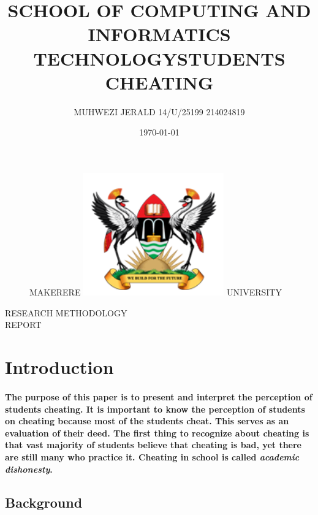 \documentclass[11pt]{article}
\begin{document}
		
\title{SCHOOL OF COMPUTING AND INFORMATICS\\ TECHNOLOGY}
\author{MUHWEZI JERALD 14/U/25199 214024819}
\date{\today{}}
\begin{figure}
	\begin{center}
	\Huge MAKERERE \includegraphics[width=172pt]{muk.png} \Huge UNIVERSITY
	\end{center}
\end{figure}
	\maketitle
	
	\begin{center}
	RESEARCH METHODOLOGY \\REPORT
	\end{center}
	
	\newpage
	\begin{center}
	\title{STUDENTS CHEATING}
	\end{center}
	\tableofcontents
	
	
	\section{ \textbf{Introduction} }
	 \paragraph{\textmd{The purpose of this paper is to present and
	  interpret the perception of students cheating. It is important to know the perception of students on cheating because most of the students cheat. This serves as an evaluation of their deed. The first thing to recognize about cheating is that vast majority of students believe that cheating is bad, yet there are still many who practice it. Cheating in school is called \emph{academic dishonesty}.}}
	 
	 \subsection{\textbf{Background}}
\end{document}
